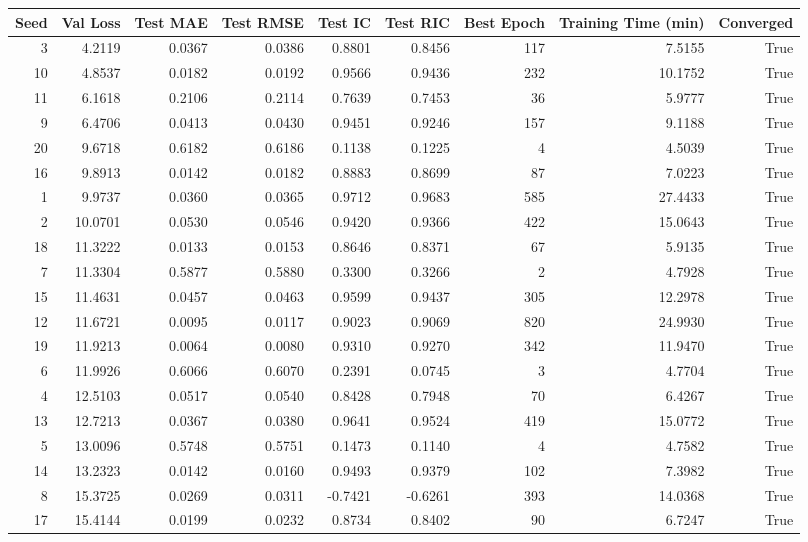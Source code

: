 \begin{tabular}{rrrrrrrrr}
\toprule
Seed & Val Loss & Test MAE & Test RMSE & Test IC & Test RIC & Best Epoch & Training Time (min) & Converged \\
\midrule
3 & 4.2119 & 0.0367 & 0.0386 & 0.8801 & 0.8456 & 117 & 7.5155 & True \\
10 & 4.8537 & 0.0182 & 0.0192 & 0.9566 & 0.9436 & 232 & 10.1752 & True \\
11 & 6.1618 & 0.2106 & 0.2114 & 0.7639 & 0.7453 & 36 & 5.9777 & True \\
9 & 6.4706 & 0.0413 & 0.0430 & 0.9451 & 0.9246 & 157 & 9.1188 & True \\
20 & 9.6718 & 0.6182 & 0.6186 & 0.1138 & 0.1225 & 4 & 4.5039 & True \\
16 & 9.8913 & 0.0142 & 0.0182 & 0.8883 & 0.8699 & 87 & 7.0223 & True \\
1 & 9.9737 & 0.0360 & 0.0365 & 0.9712 & 0.9683 & 585 & 27.4433 & True \\
2 & 10.0701 & 0.0530 & 0.0546 & 0.9420 & 0.9366 & 422 & 15.0643 & True \\
18 & 11.3222 & 0.0133 & 0.0153 & 0.8646 & 0.8371 & 67 & 5.9135 & True \\
7 & 11.3304 & 0.5877 & 0.5880 & 0.3300 & 0.3266 & 2 & 4.7928 & True \\
15 & 11.4631 & 0.0457 & 0.0463 & 0.9599 & 0.9437 & 305 & 12.2978 & True \\
12 & 11.6721 & 0.0095 & 0.0117 & 0.9023 & 0.9069 & 820 & 24.9930 & True \\
19 & 11.9213 & 0.0064 & 0.0080 & 0.9310 & 0.9270 & 342 & 11.9470 & True \\
6 & 11.9926 & 0.6066 & 0.6070 & 0.2391 & 0.0745 & 3 & 4.7704 & True \\
4 & 12.5103 & 0.0517 & 0.0540 & 0.8428 & 0.7948 & 70 & 6.4267 & True \\
13 & 12.7213 & 0.0367 & 0.0380 & 0.9641 & 0.9524 & 419 & 15.0772 & True \\
5 & 13.0096 & 0.5748 & 0.5751 & 0.1473 & 0.1140 & 4 & 4.7582 & True \\
14 & 13.2323 & 0.0142 & 0.0160 & 0.9493 & 0.9379 & 102 & 7.3982 & True \\
8 & 15.3725 & 0.0269 & 0.0311 & -0.7421 & -0.6261 & 393 & 14.0368 & True \\
17 & 15.4144 & 0.0199 & 0.0232 & 0.8734 & 0.8402 & 90 & 6.7247 & True \\
\bottomrule
\end{tabular}
